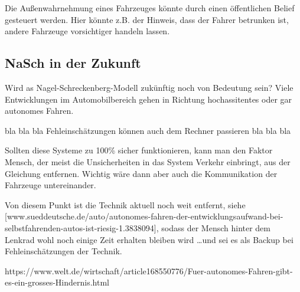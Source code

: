 Die Außenwahrnehmung eines Fahrzeuges könnte durch einen öffentlichen Belief gesteuert werden. 
Hier könnte z.B. der Hinweis, dass der Fahrer betrunken ist, andere Fahrzeuge vorsichtiger handeln lassen.








\subsection{NaSch in der Zukunft}

Wird as Nagel-Schreckenberg-Modell zukünftig noch von Bedeutung sein? 
Viele Entwicklungen im Automobilbereich gehen in Richtung hochassitentes oder gar autonomes Fahren.

bla bla bla Fehleinschätzungen können auch dem Rechner passieren bla bla bla

Sollten diese Systeme zu 100\% sicher funktionieren, kann man den Faktor Mensch, der meist die Unsicherheiten in das System Verkehr einbringt, aus der Gleichung entfernen.
Wichtig wäre dann aber auch die Kommunikation der Fahrzeuge untereinander.

Von diesem Punkt ist die Technik aktuell noch weit entfernt, siehe [www.sueddeutsche.de/auto/autonomes-fahren-der-entwicklungsaufwand-bei-selbstfahrenden-autos-ist-riesig-1.3838094], sodass der Mensch hinter dem Lenkrad wohl noch einige Zeit erhalten bleiben wird \dots und sei es als Backup bei Fehleinschätzungen der Technik.

https://www.welt.de/wirtschaft/article168550776/Fuer-autonomes-Fahren-gibt-es-ein-grosses-Hindernis.html
